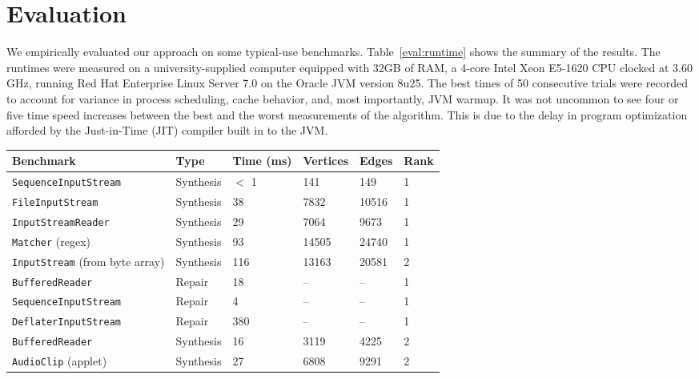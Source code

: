 \section{Evaluation}
\label{sec:evaluation}

We empirically evaluated our approach on some typical-use benchmarks. Table~\ref{eval:runtime} shows the summary of the results. The runtimes were measured on a university-supplied computer equipped with 32GB of RAM, a 4-core Intel Xeon E5-1620 CPU clocked at 3.60 GHz, running Red Hat Enterprise Linux Server 7.0 on the Oracle JVM version 8u25. The best times of 50 consecutive trials were recorded to account for variance in process scheduling, cache behavior, and, most importantly, JVM warmup. It was not uncommon to see four or five time speed increases between the best and the worst measurements of the algorithm. This is due to the delay in program optimization afforded by the Just-in-Time (JIT) compiler built in to the JVM.

\begin{table*}[t]
  \centering
  \renewcommand{\arraystretch}{1.25}
  \begin{tabularx}{\textwidth}{| X | l | l | l | l | l |}
    \hline
    \textbf{Benchmark} & \textbf{Type} & \textbf{Time (ms)} & \textbf{Vertices} & \textbf{Edges} & \textbf{Rank} \\ \hline
	\texttt{SequenceInputStream} & Synthesis & $<$ 1 & 141   & 149   & 1 \\ \hline
    \texttt{FileInputStream}     & Synthesis & 38  & 7832  & 10516 & 1 \\ \hline
    \texttt{InputStreamReader}   & Synthesis & 29  & 7064  & 9673  & 1 \\ \hline
    \texttt{Matcher} (regex)     & Synthesis & 93  & 14505 & 24740 & 1 \\ \hline
    \texttt{InputStream} (from byte array) & Synthesis & 116 & 13163  & 20581  & 2 \\ \hline
    \texttt{BufferedReader}      & Repair    & 18  & --    & --    & 1 \\ \hline
    \texttt{SequenceInputStream} & Repair    & 4   & --    & --    & 1 \\ \hline
    \texttt{DeflaterInputStream} & Repair    & 380 & -- & -- & 1 \\ \hline
    \texttt{BufferedReader}      & Synthesis & 16  & 3119  & 4225  & 2 \\ \hline
    \texttt{AudioClip} (applet)  & Synthesis & 27  & 6808  & 9291  & 2 \\ \hline
  \end{tabularx}
  \caption{Typical-use runtimes in various benchmark. ``Vertices'' and ``Edges'' refer to the number of objects included inside a neighborhood of cost-radius 4.5 around the desired type. The entire Java standard library was used to build the graph before running the benchmarks; it consistently took around 5 seconds to load the data set from its serialized form. Each test case was initialized with a small environment consisting of two strings, two InputStreams, and an OutputStream}
  \label{eval:runtime}
\end{table*}

